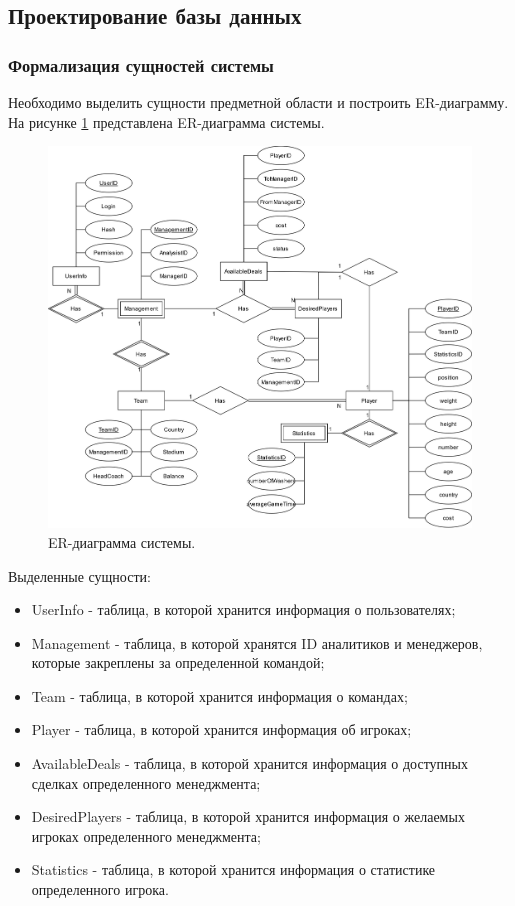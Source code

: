 \subsection{Проектирование базы данных}
\subsubsection{Формализация сущностей системы}
Необходимо выделить сущности предметной области и построить ER-диаграмму. 
На рисунке \ref{img:ER} представлена ER-диаграмма системы.
\begin{figure}[h!]
	\centering
	\includegraphics[scale=0.18]{img/ER.png}
	\caption{ER-диаграмма системы.}
	\label{img:ER}
\end{figure}
\newpage
Выделенные сущности:
\begin{itemize}
	\item[1)] UserInfo - таблица, в которой хранится информация о пользователях;
	\item[2)] Management - таблица, в которой хранятся ID аналитиков и менеджеров, которые закреплены за определенной командой;
	\item[3)] Team - таблица, в которой хранится информация о командах;
	\item[4)] Player - таблица, в которой хранится информация об игроках;
	\item[5)] AvailableDeals - таблица, в которой хранится информация о доступных сделках определенного менеджмента;
	\item[6)] DesiredPlayers - таблица, в которой хранится информация о желаемых игроках определенного менеджмента;
	\item[7)] Statistics - таблица, в которой хранится информация о статистике определенного игрока.
\end{itemize}

